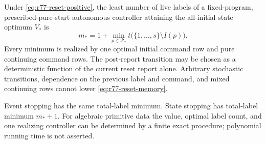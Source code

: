 \begin{theorem}
\label{thm:r77-reset-cover}
Under \eqref{eq:r77-reset-positive}, the least number of live labels of
a fixed-program, prescribed-pure-start autonomous controller attaining
the all-initial-state optimum $V_*$ is
\begin{equation}\label{eq:r77-reset-memory}
 m_* =1+\min_{p\in\mathcal P_*}
                  t\bigl(\{1,\ldots,s\}\setminus I(p)\bigr).
\end{equation}
Every minimum is realized by one optimal initial command row and pure
continuing command rows.  The post-report transition may be chosen as a
deterministic function of the current reset report alone.  Arbitrary
stochastic transitions, dependence on the previous label and command,
and mixed continuing rows cannot lower \eqref{eq:r77-reset-memory}.

Event stopping has the same total-label minimum.  State stopping has
total-label minimum $m_*+1$.  For algebraic primitive data the value,
optimal label count, and one realizing controller can be determined
by a finite exact procedure; polynomial running time is not asserted.
\end{theorem}
